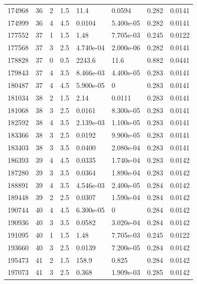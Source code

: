 \documentclass[preview]{standalone}
\begin{document}
{{{{\begin{tabular}{L{1.2cm}C{1.2cm} C{0.3cm}C{0.5cm} C{1.4cm}C{1.4cm} C{1.4cm}C{1.4cm}}
  174968  &    36  & 2     & 1.5 &  11.4  & 0.0594  & 0.282 &  0.0141   \\ 
  174999  &    36  & 4     & 4.5 &  0.0104  & 5.400e-05  & 0.282 &  0.0141   \\ 
  177552  &    37  & 1     & 1.5 &  1.48  & 7.705e-03  & 0.245 &  0.0122   \\ 
  177568  &    37  & 3     & 2.5 &  4.740e-04  & 2.000e-06  & 0.282 &  0.0141   \\ 
  178828  &    37  & 0     & 0.5 &  2243.6  & 11.6  & 0.882 &  0.0441   \\ 
  179843  &    37  & 4     & 3.5 &  8.466e-03  & 4.400e-05  & 0.283 &  0.0141   \\ 
  180487  &    37  & 4     & 4.5 &  5.900e-05  & 0  & 0.283 &  0.0141   \\ 
  181034  &    38  & 2     & 1.5 &  2.14  & 0.0111  & 0.283 &  0.0141   \\ 
  181068  &    38  & 3     & 2.5 &  0.0161  & 8.300e-05  & 0.283 &  0.0141   \\ 
  182592  &    38  & 4     & 3.5 &  2.139e-03  & 1.100e-05  & 0.283 &  0.0141   \\ 
  183366  &    38  & 3     & 2.5 &  0.0192  & 9.900e-05  & 0.283 &  0.0141   \\ 
  183403  &    38  & 3     & 3.5 &  0.0400  & 2.080e-04  & 0.283 &  0.0141   \\ 
  186393  &    39  & 4     & 4.5 &  0.0335  & 1.740e-04  & 0.283 &  0.0142   \\ 
  187280  &    39  & 3     & 3.5 &  0.0364  & 1.890e-04  & 0.283 &  0.0142   \\ 
  188891  &    39  & 4     & 3.5 &  4.546e-03  & 2.400e-05  & 0.284 &  0.0142   \\ 
  189448  &    39  & 2     & 2.5 &  0.0307  & 1.590e-04  & 0.284 &  0.0142   \\ 
  190744  &    40  & 4     & 4.5 &  6.300e-05  & 0  & 0.284 &  0.0142   \\ 
  190936  &    40  & 3     & 3.5 &  0.0582  & 3.020e-04  & 0.284 &  0.0142   \\ 
  191095  &    40  & 1     & 1.5 &  1.48  & 7.705e-03  & 0.245 &  0.0122   \\ 
  193660  &    40  & 3     & 2.5 &  0.0139  & 7.200e-05  & 0.284 &  0.0142   \\ 
  195473  &    41  & 2     & 1.5 &  158.9  & 0.825  & 0.284 &  0.0142   \\ 
  197073  &    41  & 3     & 2.5 &  0.368  & 1.909e-03  & 0.285 &  0.0142   \\ 

\end{tabular}}}}}
\end{document}

